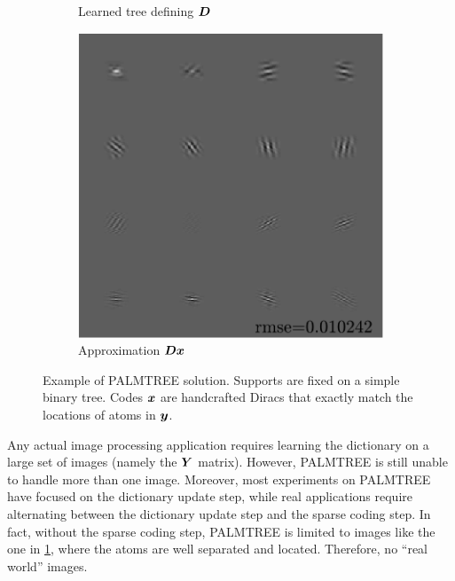 \begin{figure}[!ht]
\begin{subfigure}[b]{0.325\textwidth}
	\caption{Learned tree defining $\bm{D}$}
\end{subfigure}
\begin{subfigure}[b]{0.325\textwidth}\centering
\includegraphics[width=1\textwidth]{figures/tree-learn-setup/xp_learnsupp256_curvelet_decomp3[tree-binary_dpth4]_supp-generic3x3_[fixed-supports]_approx.pdf}
	\caption{Approximation $\bm{D}\bm{x}$}
\end{subfigure}
\caption{Example of PALMTREE solution. Supports are fixed on a simple binary tree. Codes $\bm{x}$ are handcrafted Diracs that exactly match the locations of atoms in $\bm{y}$.}\label{fig_exple_fixed_tree}
\end{figure}

Any actual image processing application requires learning the dictionary on a large set of images (namely the $\bm{Y}$ matrix). However, \ac{PALMTREE} is still unable to handle more than one image. Moreover, most experiments on \ac{PALMTREE} have focused on the dictionary update step, while real applications require alternating between the dictionary update step and the sparse coding step. In fact, without the sparse coding step, \ac{PALMTREE} is limited to images like the one in \cref{fig_exple_fixed_tree}, where the atoms are well separated and located. Therefore, no “real world” images.



